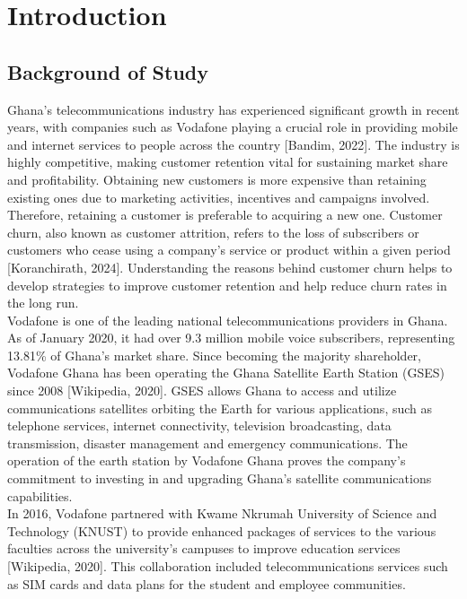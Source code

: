\documentclass[doublespacing,12pt]{report}
\begin{document}
\newpage
\listoffigures

\newpage
\listoftables



 




\newpage
\chapter{Introduction}


\section{Background of Study}

Ghana's telecommunications industry has experienced significant growth in recent years, with companies such as Vodafone playing a crucial role in providing mobile and internet services to people across the country [Bandim, 2022]. The industry is highly competitive, making customer retention vital for sustaining market share and profitability. Obtaining new customers is more expensive than retaining existing ones due to marketing activities, incentives and campaigns involved. Therefore, retaining a customer is preferable to acquiring a new one. Customer churn, also known as customer attrition, refers to the loss of subscribers or customers who cease using a company’s service or product within a given period [Koranchirath, 2024]. Understanding the reasons behind customer churn helps to develop strategies to improve customer retention and help reduce churn rates in the long run.\\
Vodafone is one of the leading national telecommunications providers in Ghana. As of January 2020, it had over 9.3 million mobile voice subscribers, representing 13.81\% of Ghana's market share. Since becoming the majority shareholder, Vodafone Ghana has been operating the Ghana Satellite Earth Station (GSES) since 2008 [Wikipedia, 2020]. GSES allows Ghana to access and utilize communications satellites orbiting the Earth for various applications, such as telephone services, internet connectivity, television broadcasting, data transmission, disaster management and emergency communications. The operation of the earth station by Vodafone Ghana proves the company's commitment to investing in and upgrading Ghana's satellite communications capabilities.\\
In 2016, Vodafone partnered with Kwame Nkrumah University of Science and Technology (KNUST) to provide enhanced packages of services to the various faculties across the university's campuses to improve education services [Wikipedia, 2020]. This collaboration included telecommunications services such as SIM cards and data plans for the student and employee communities.\\
\end{document}
